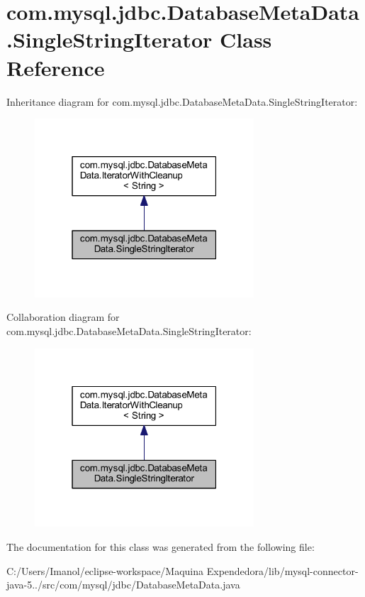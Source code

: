 \hypertarget{classcom_1_1mysql_1_1jdbc_1_1_database_meta_data_1_1_single_string_iterator}{}\section{com.\+mysql.\+jdbc.\+Database\+Meta\+Data.\+Single\+String\+Iterator Class Reference}
\label{classcom_1_1mysql_1_1jdbc_1_1_database_meta_data_1_1_single_string_iterator}


Inheritance diagram for com.\+mysql.\+jdbc.\+Database\+Meta\+Data.\+Single\+String\+Iterator\+:
\nopagebreak
\begin{figure}[H]
\begin{center}
\leavevmode
\includegraphics[width=232pt]{classcom_1_1mysql_1_1jdbc_1_1_database_meta_data_1_1_single_string_iterator__inherit__graph}
\end{center}
\end{figure}


Collaboration diagram for com.\+mysql.\+jdbc.\+Database\+Meta\+Data.\+Single\+String\+Iterator\+:
\nopagebreak
\begin{figure}[H]
\begin{center}
\leavevmode
\includegraphics[width=232pt]{classcom_1_1mysql_1_1jdbc_1_1_database_meta_data_1_1_single_string_iterator__coll__graph}
\end{center}
\end{figure}


The documentation for this class was generated from the following file\+:\begin{DoxyCompactItemize}
\item 
C\+:/\+Users/\+Imanol/eclipse-\/workspace/\+Maquina Expendedora/lib/mysql-\/connector-\/java-\/5../src/com/mysql/jdbc/Database\+Meta\+Data.\+java\end{DoxyCompactItemize}
